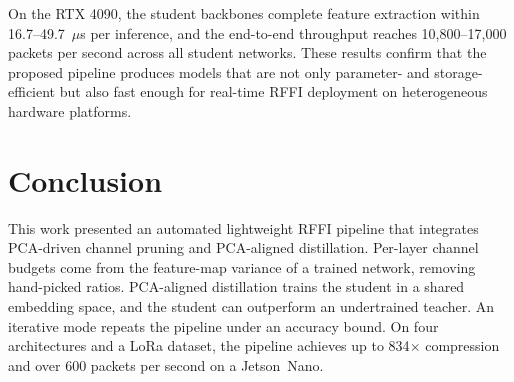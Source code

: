 \documentclass[journal,comsoc]{IEEEtran}
\begin{document}
On the RTX 4090, the student backbones complete feature extraction within 16.7--49.7~$\mu$s per inference, and the end-to-end throughput reaches 10,800--17,000 packets per second across all student networks.
These results confirm that the proposed pipeline produces models that are not only parameter- and storage-efficient but also fast enough for real-time RFFI deployment on heterogeneous hardware platforms.


\section{Conclusion}
\label{sec:conclusion}
This work presented an automated lightweight RFFI pipeline that integrates PCA-driven channel pruning and PCA-aligned distillation.
Per-layer channel budgets come from the feature-map variance of a trained network, removing hand-picked ratios.
PCA-aligned distillation trains the student in a shared embedding space, and the student can outperform an undertrained teacher.
An iterative mode repeats the pipeline under an accuracy bound.
On four architectures and a LoRa dataset, the pipeline achieves up to 834$\times$ compression and over 600 packets per second on a Jetson~Nano.




\end{document}
